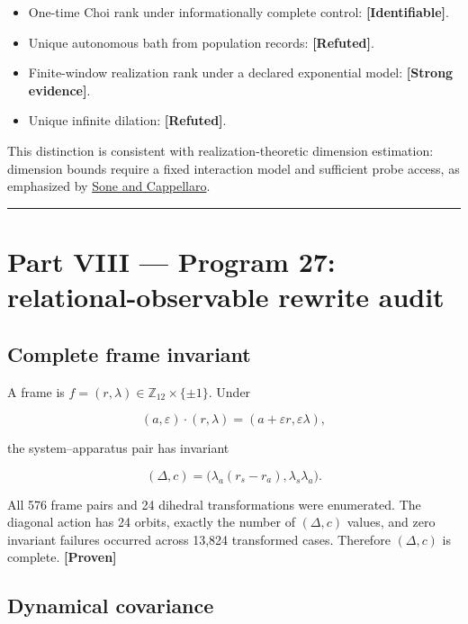 \documentclass[11pt,a4paper,openany]{report}
\newcommand{\statusProven}{\textcolor{fingreen}{[Proven]}}
\newcommand{\statusStrong}{\textcolor{finblue}{[Strong evidence]}}
\newcommand{\statusRefuted}{\textcolor{finred}{[Refuted]}}
\begin{document}
\begin{itemize}
\item 
One-time Choi rank under informationally complete control: \textbf{[Identifiable]}.

\item 
Unique autonomous bath from population records: \textbf{\statusRefuted{}}.

\item 
Finite-window realization rank under a declared exponential model: \textbf{\statusStrong{}}.

\item 
Unique infinite dilation: \textbf{\statusRefuted{}}.

\end{itemize}

This distinction is consistent with realization-theoretic dimension estimation: dimension bounds require a fixed interaction model and sufficient probe access, as emphasized by \href{https://arxiv.org/abs/1702.03280}{Sone and Cappellaro}.

\par\medskip\hrule\medskip

\chapter{Part VIII — Program 27: relational-observable rewrite audit}

\section{Complete frame invariant}

A frame is \(f=(r,\lambda)\in\mathbb Z_{12}\times\{\pm1\}\). Under

\[
(a,\varepsilon)\cdot(r,\lambda)
=(a+\varepsilon r,\varepsilon\lambda),
\]

the system–apparatus pair has invariant

\[
(\Delta,c)
=\bigl(\lambda_a(r_s-r_a),\lambda_s\lambda_a\bigr).
\]

All 576 frame pairs and 24 dihedral transformations were enumerated. The diagonal action has 24 orbits, exactly the number of \((\Delta,c)\) values, and zero invariant failures occurred across 13,824 transformed cases. Therefore \((\Delta,c)\) is complete. \textbf{\statusProven{}}

\section{Dynamical covariance}
\end{document}
